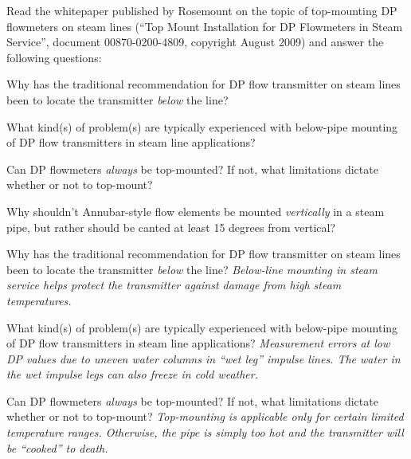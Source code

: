 

Read the whitepaper published by Rosemount on the topic of top-mounting DP flowmeters on steam lines (``Top Mount Installation for DP Flowmeters in Steam Service'', document 00870-0200-4809, copyright August 2009) and answer the following questions:

\vskip 30pt

Why has the traditional recommendation for DP flow transmitter on steam lines been to locate the transmitter {\it below} the line?

\vskip 50pt

What kind(s) of problem(s) are typically experienced with below-pipe mounting of DP flow transmitters in steam line applications?

\vskip 50pt

Can DP flowmeters {\it always} be top-mounted?  If not, what limitations dictate whether or not to top-mount?

\vskip 50pt

Why shouldn't Annubar-style flow elements be mounted {\it vertically} in a steam pipe, but rather should be canted at least 15 degrees from vertical?







Why has the traditional recommendation for DP flow transmitter on steam lines been to locate the transmitter {\it below} the line?  {\it Below-line mounting in steam service helps protect the transmitter against damage from high steam temperatures.}

\vskip 10pt

What kind(s) of problem(s) are typically experienced with below-pipe mounting of DP flow transmitters in steam line applications? {\it Measurement errors at low DP values due to uneven water columns in ``wet leg'' impulse lines.  The water in the wet impulse legs can also freeze in cold weather.}

\vskip 10pt

Can DP flowmeters {\it always} be top-mounted?  If not, what limitations dictate whether or not to top-mount?  {\it Top-mounting is applicable only for certain limited temperature ranges.  Otherwise, the pipe is simply too hot and the transmitter will be ``cooked'' to death.}

